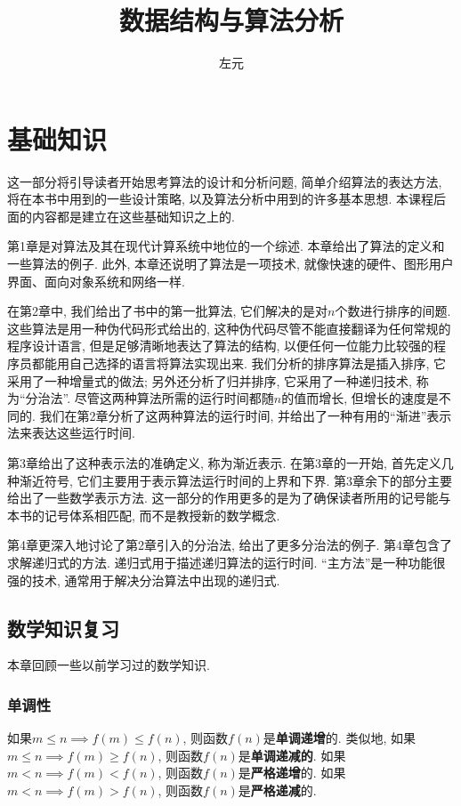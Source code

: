 \documentclass[oneside,10pt,fontset=none]{ctexbook}
\title{数据结构与算法分析}
\author{左元}
\numberwithin{definition}{chapter}
\numberwithin{theorem}{chapter}
\numberwithin{proof}{chapter}
\begin{document}
\maketitle
\tableofcontents

\part{基础知识}

这一部分将引导读者开始思考算法的设计和分析问题, 简单介绍算法的表达方法, 将在本书中用到的一些设计策略, 以及算法分析中用到的许多基本思想. 本课程后面的内容都是建立在这些基础知识之上的.

第1章是对算法及其在现代计算系统中地位的一个综述. 本章给出了算法的定义和一些算法的例子. 此外, 本章还说明了算法是一项技术, 就像快速的硬件、图形用户界面、面向对象系统和网络一样.

在第2章中, 我们给出了书中的第一批算法, 它们解决的是对$n$个数进行排序的间题. 这些算法是用一种伪代码形式给出的, 这种伪代码尽管不能直接翻译为任何常规的程序设计语言, 但是足够清晰地表达了算法的结构, 以便任何一位能力比较强的程序员都能用自己选择的语言将算法实现出来. 我们分析的排序算法是插入排序, 它采用了一种增量式的做法; 另外还分析了归并排序, 它采用了一种递归技术, 称为``分治法''. 尽管这两种算法所需的运行时间都随$n$的值而增长, 但增长的速度是不同的. 我们在第2章分析了这两种算法的运行时间, 并给出了一种有用的``渐进''表示法来表达这些运行时间.

第3章给出了这种表示法的准确定义, 称为渐近表示. 在第3章的一开始, 首先定义几种渐近符号, 它们主要用于表示算法运行时间的上界和下界. 第3章余下的部分主要给出了一些数学表示方法. 这一部分的作用更多的是为了确保读者所用的记号能与本书的记号体系相匹配, 而不是教授新的数学概念.

第4章更深入地讨论了第2章引入的分治法, 给出了更多分治法的例子. 第4章包含了求解递归式的方法. 递归式用于描述递归算法的运行时间. ``主方法''是一种功能很强的技术, 通常用于解决分治算法中出现的递归式.

\chapter{数学知识复习}

本章回顾一些以前学习过的数学知识.

\section{单调性}

如果$m\leq n \implies f(m)\leq f(n)$, 则函数$f(n)$是\textbf{单调递增}的. 类似地, 如果$m\leq n \implies f(m)\geq f(n)$, 则函数$f(n)$是\textbf{单调递减的}. 如果$m<n \implies f(m)<f(n)$, 则函数$f(n)$是\textbf{严格递增}的. 如果$m<n \implies f(m)>f(n)$, 则函数$f(n)$是\textbf{严格递减}的.
\end{document}
